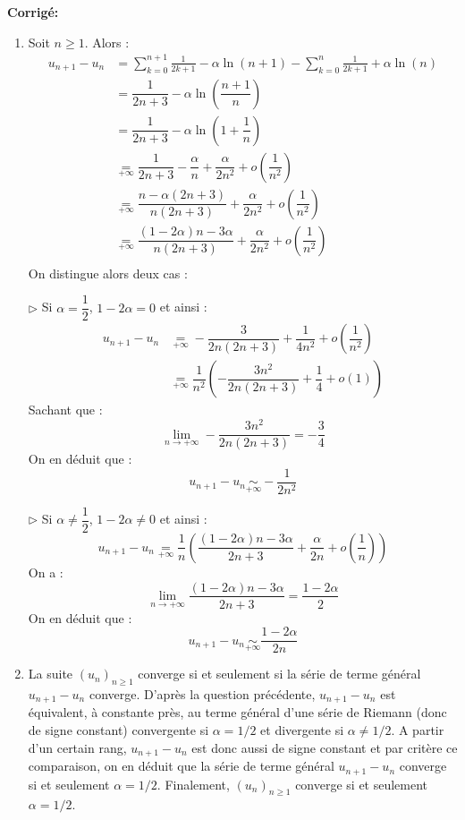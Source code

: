 \documentclass[a4paper,twoside,french,10pt]{VcCours}
\newcommand{\corr}{\textbf{Corrigé:}}
\begin{document}
\corr 

\begin{enumerate}
\item Soit $n \geq 1$. Alors :
\begin{align*}
u_{n+1}-u_n & = \sum_{k=0}^{n+1} \frac{1}{2k+1} -  \alpha \ln(n+1) -\sum_{k=0}^n \frac{1}{2k+1} + \alpha \ln(n) \\
& = \dfrac{1}{2n+3} - \alpha \ln \left( \dfrac{n+1}{n} \right) \\
& = \dfrac{1}{2n+3} - \alpha \ln \left( 1+ \dfrac{1}{n} \right) \\
& \underset{+ \infty}{=} \dfrac{1}{2n+3} - \dfrac{\alpha}{n}  + \dfrac{\alpha}{2n^2} + o \left( \dfrac{1}{n^2} \right) \\
& \underset{+ \infty}{=} \dfrac{n- \alpha(2n+3)}{n(2n+3)}  +\dfrac{\alpha}{2n^2} + o \left( \dfrac{1}{n^2} \right) \\
& \underset{+ \infty}{=} \dfrac{(1-2 \alpha)n - 3 \alpha}{n(2n+3)}  +\dfrac{\alpha}{2n^2} + o \left( \dfrac{1}{n^2} \right) \\
\end{align*}
On distingue alors deux cas :

\medskip

\noindent $\rhd$ Si $\alpha = \dfrac{1}{2}$, $1-2 \alpha=0$ et ainsi :
\begin{align*}
 u_{n+1}-u_n & \underset{+ \infty}{=} -\dfrac{3}{2n(2n+3)}  + \dfrac{1}{4n^2} + o \left( \dfrac{1}{n^2} \right) \\
 & \underset{+ \infty}{=} \dfrac{1}{n^2} \left( -\dfrac{3n^2}{2n(2n+3)}  + \dfrac{1}{4} + o (1) \right) 
 \end{align*}
 Sachant que :
 $$ \lim_{n \rightarrow + \infty} -\dfrac{3n^2}{2n(2n+3)} = - \dfrac{3}{4}$$
 On en déduit que :
 $$ u_{n+1}-u_n \underset{+ \infty}{\sim} - \dfrac{1}{2n^2}$$

\medskip

\noindent $\rhd$ Si $\alpha \neq \dfrac{1}{2}$, $1-2 \alpha \neq 0$ et ainsi :
$$
 u_{n+1}-u_n  \underset{+ \infty}{=} \dfrac{1}{n} \left( \dfrac{(1-2 \alpha)n - 3 \alpha}{2n+3}  +\dfrac{\alpha}{2n} + o \left( \dfrac{1}{n} \right)\right)
 $$
On a :
$$ \lim_{n \rightarrow + \infty} \dfrac{(1-2 \alpha)n - 3 \alpha}{2n+3}  = \dfrac{1-2 \alpha}{2}$$
On en déduit que :
$$ u_{n+1}-u_n \underset{+ \infty}{\sim}  \dfrac{1-2 \alpha}{2n}$$
\item La suite $(u_n)_{n \geq 1}$ converge si et seulement si la série de terme général $u_{n+1}-u_n$ converge. D'après la question précédente, $u_{n+1}-u_n$ est équivalent, à constante près, au terme général d'une série de Riemann (donc de signe constant) convergente si $\alpha = 1/2$ et divergente si $\alpha \neq 1/2$. A partir d'un certain rang, $u_{n+1}-u_n$ est donc aussi de signe constant et par critère ce comparaison, on en déduit que la série de terme général $u_{n+1}-u_n$ converge si et seulement $\alpha =1/2$. Finalement, $(u_n)_{n \geq 1}$ converge si et seulement $\alpha = 1/2$.
\end{enumerate}
\end{document}
